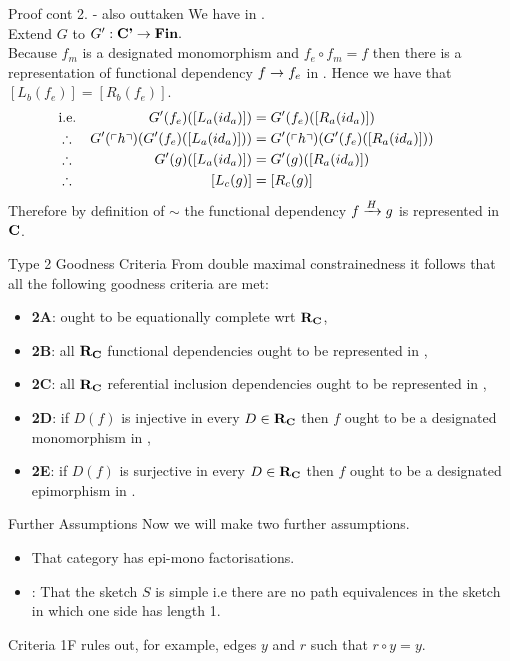 \begin{frame}{Proof cont 2. - also outtaken}
We have   in \catcp.\\
\medskip
Extend $G$ to $G':\catcp \morph \Fin.$ \\
Because $f_m$ is a designated monomorphism and $f_e \circ f_m = f$ then
there is a representation of functional dependency $f \morph f_e$ in \catc.
Hence  we have that $[L_b(f_e)]= [R_b(f_e)]$.
\medskip
\begin{align*}
&\mbox{i.e.}& G'(f_e)([L_a(id_a)])              &= G'(f_e)([R_a(id_a)])       \\
&\therefore & G'(\qq{h}) (G'(f_e)([L_a(id_a)])) &= G'(\qq{h}) (G'(f_e)([R_a(id_a)])) \\
&\therefore & G'(g)([L_a(id_a)])              &= G'(g)([R_a(id_a)]) & &    \\
&\therefore & [L_c(g)] &= [R_c(g)] 
\end{align*}
Therefore by definition of $\sim$ the functional dependency
$\fundep{H}{f}{g}$ is represented in $\catc$.
\end{frame}

\begin{frame}{Type 2 Goodness Criteria}{\slidecontext}
From double maximal constrainedness it follows that all the following goodness criteria are met: 
\begin{itemize}
\item \textbf{2A}:  \catcw ought to be equationally complete wrt $\reqtc$,         
\item \textbf{2B}:  all $\reqtc$ functional dependencies ought to be represented in \catc,
\item \textbf{2C}:  all $\reqtc$ referential inclusion dependencies ought to be represented in \catc, 
\pause \item \textbf{2D}:  if $D(f)$ is injective in every $D \in \reqtc$ then $f$ ought to be a designated monomorphism in \catc,
\pause \item \textbf{2E}:  if $D(f)$ is surjective in every $D \in \reqtc$ then $f$ ought to be a designated epimorphism in \catc.
\end{itemize}
\iffalse
We can also show that \textbf{2B} can be weakened. If all functional dependencies \textbf{upon edges} from sketch $S$ are represented then all functional dependencies are represented. \highlight{Too much information}
\fi
\end{frame}

\begin{frame}{Further Assumptions}
Now we will make two further assumptions.
\begin{itemize}
\item That category \catcw has epi-mono factorisations.
\item {}: That the sketch $S$ is simple i.e there are no path equivalences 
in the sketch in which one side has length 1. 
\end{itemize}
Criteria 1F rules out, for example, edges $y$ and $r$ such that $r \circ y = y$.
\end{frame}

